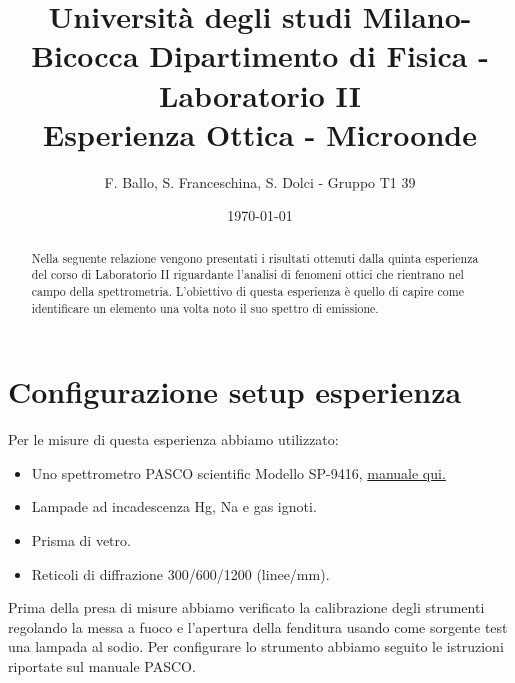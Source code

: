 \documentclass[letterpaper,12pt]{article}
\begin{document}
\title{{\small Università degli studi Milano-Bicocca  Dipartimento di Fisica - Laboratorio II }\\
	Esperienza Ottica - Microonde}
\author{F. Ballo, S. Franceschina, S. Dolci - Gruppo T1 39}
\date{\today}
\maketitle
\thispagestyle{logoheader}


\begin{abstract}
	Nella seguente relazione vengono presentati i risultati ottenuti dalla quinta esperienza del corso di 
    Laboratorio II riguardante l'analisi di fenomeni ottici che rientrano nel campo della spettrometria. L'obiettivo di questa esperienza è quello di capire come
    identificare un elemento una volta noto il suo spettro di emissione.
	\begin{adjustwidth}{-1cm}{-1cm}
	\end{adjustwidth}
\end{abstract}
\tableofcontents
\newpage

\section{Configurazione setup esperienza}
Per le misure di questa esperienza abbiamo utilizzato:

\begin{itemize}
    \item Uno spettrometro PASCO scientific Modello SP-9416, \href{https://cdn.pasco.com/product_document/Student-Spectrometer-Manual-SP-9268A.pdf}{manuale qui.}
    \item Lampade ad incadescenza Hg, Na e gas ignoti.
    \item Prisma di vetro.
    \item Reticoli di diffrazione 300/600/1200 (linee/mm).
\end{itemize}
Prima della presa di misure abbiamo verificato la calibrazione degli strumenti regolando la messa a fuoco e 
l'apertura della fenditura usando come sorgente test una lampada al sodio. Per configurare lo strumento abbiamo
seguito le istruzioni riportate sul manuale PASCO. \\
    
\end{document}
